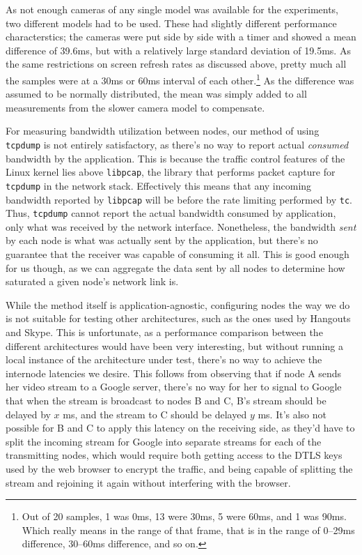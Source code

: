 As not enough cameras of any single model was available for the experiments, two different models had to be used. These had slightly different performance characterstics; the cameras were put side by side with a timer and showed a mean difference of 39.6ms, but with a relatively large standard deviation of 19.5ms. As the same restrictions on screen refresh rates as discussed above, pretty much all the samples were at a 30ms or 60ms interval of each other.\footnote{Out of 20 samples, 1 was 0ms, 13 were 30ms, 5 were 60ms, and 1 was 90ms. Which really means in the range of that frame, that is in the range of 0--29ms difference, 30--60ms difference, and so on.} As the difference was assumed to be normally distributed, the mean was simply added to all measurements from the slower camera model to compensate.

For measuring bandwidth utilization between nodes, our method of using \texttt{tcpdump} is not entirely satisfactory, as there's no way to report actual \emph{consumed} bandwidth by the application. This is because the traffic control features of the Linux kernel lies above \texttt{libpcap}, the library that performs packet capture for \texttt{tcpdump} in the network stack. Effectively this means that any incoming bandwidth reported by \texttt{libpcap} will be before the rate limiting performed by \texttt{tc}. Thus, \texttt{tcpdump} cannot report the actual bandwidth consumed by application, only what was received by the network interface. Nonetheless, the bandwidth \emph{sent} by each node is what was actually sent by the application, but there's no guarantee that the receiver was capable of consuming it all. This is good enough for us though, as we can aggregate the data sent by all nodes to determine how saturated a given node's network link is.

While the method itself is application-agnostic, configuring nodes the way we do is not suitable for testing other architectures, such as the ones used by Hangouts and Skype. This is unfortunate, as a performance comparison between the different architectures would have been very interesting, but without running a local instance of the architecture under test, there's no way to achieve the internode latencies we desire. This follows from observing that if node A sends her video stream to a Google server, there's no way for her to signal to Google that when the stream is broadcast to nodes B and C, B's stream should be delayed by $x$ ms, and the stream to C should be delayed $y$ ms. It's also not possible for B and C to apply this latency on the receiving side, as they'd have to split the incoming stream for Google into separate streams for each of the transmitting nodes, which would require both getting access to the DTLS keys used by the web browser to encrypt the traffic, and being capable of splitting the stream and rejoining it again without interfering with the browser.


